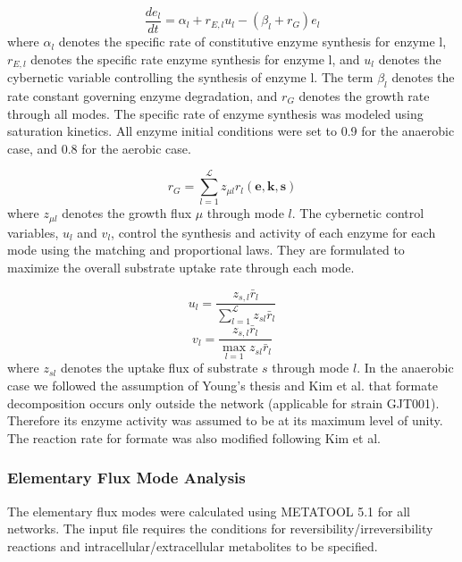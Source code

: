 \documentclass[10pt,twocolumn,twoside,final]{IEEEtran}
\begin{document}
\begin{equation}
	\frac{de_{l}}{dt}  = \alpha_{l} + r_{E,l}u_{l} - \left(\beta_{l}+r_{G}\right)e_{l}
\end{equation}
where $\alpha_{l}$ denotes the specific rate of constitutive enzyme synthesis for enzyme l, $r_{E,l}$ denotes the specific rate enzyme synthesis for enzyme l, and $u_{l}$ denotes the cybernetic variable controlling the synthesis of enzyme l.
The term $\beta_{l}$ denotes the rate constant governing enzyme degradation, and $r_{G}$ denotes the growth rate through all modes.
The specific rate of enzyme synthesis was modeled using saturation kinetics.
All enzyme initial conditions were set to 0.9 for the anaerobic case, and 0.8 for the aerobic case.

\begin{equation}
	r_{G}  = \sum_{l = 1}^{\mathcal{L}}z_{\mu l}r_{l}\left(\mathbf{e},\mathbf{k},\mathbf{s}\right)
\end{equation}
where $z_{\mu l}$ denotes the growth flux $\mu$ through mode $l$.
The cybernetic control variables, $u_{l}$ and $v_{l}$, control the synthesis and activity of each enzyme for each mode using the matching and proportional laws\cite{2007_young_ramkrishna_BiotechProg}.
They are formulated to maximize the overall substrate uptake rate through each mode.

\begin{equation}
	u_{l}  = \frac{z_{s,l}\bar{r}_{l}}{\sum_{l = 1}^{\mathcal{L}}z_{sl}\bar{r}_{l}}
\end{equation}
\begin{equation}
	v_{l} = \frac{z_{s,l}\bar{r}_{l}}{\max_{l=1} z_{sl}\bar{r}_{l}}
\end{equation}
where $z_{sl}$ denotes the uptake flux of substrate $s$ through mode $l$.
In the anaerobic case we followed the assumption of Young's thesis\cite{2005_Young} and Kim et al.\cite{2008_kim_varner_ramkrishna_BiotechProg} that formate decomposition occurs only outside the network (applicable for strain GJT001).
Therefore its enzyme activity was assumed to be at its maximum level of unity.
The reaction rate for formate was also modified following Kim et al.\cite{2008_kim_varner_ramkrishna_BiotechProg}

\subsubsection*{Elementary Flux Mode Analysis}
The elementary flux modes were calculated using METATOOL 5.1\cite{2006_vonKamp_Metatool} for all networks.
The input file requires the conditions for reversibility/irreversibility reactions and intracellular/extracellular metabolites to be specified.
\end{document}
